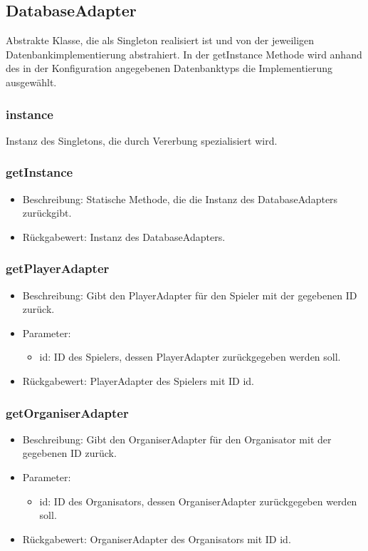 \documentclass[a4paper]{scrreprt}
\begin{document}
    \subsection{DatabaseAdapter}
    Abstrakte Klasse, die als Singleton realisiert ist und von der jeweiligen Datenbankimplementierung abstrahiert.
    In der getInstance Methode wird anhand des in der Konfiguration angegebenen Datenbanktyps die Implementierung ausgewählt.

    \subsubsection{instance}
    Instanz des Singletons, die durch Vererbung spezialisiert wird.

    \subsubsection{getInstance}
    \begin{itemize}
        \item Beschreibung: Statische Methode, die die Instanz des DatabaseAdapters zurückgibt.
        \item Rückgabewert: Instanz des DatabaseAdapters.
    \end{itemize}

    \subsubsection{getPlayerAdapter}
    \begin{itemize}
        \item Beschreibung: Gibt den PlayerAdapter für den Spieler mit der gegebenen ID zurück.
        \item Parameter:
        \begin{itemize}
            \item id: ID des Spielers, dessen PlayerAdapter zurückgegeben werden soll.
        \end{itemize}
        \item Rückgabewert: PlayerAdapter des Spielers mit ID id.
    \end{itemize}

    \subsubsection{getOrganiserAdapter}
    \begin{itemize}
        \item Beschreibung: Gibt den OrganiserAdapter für den Organisator mit der gegebenen ID zurück.
        \item Parameter:
        \begin{itemize}
            \item id: ID des Organisators, dessen OrganiserAdapter zurückgegeben werden soll.
        \end{itemize}
        \item Rückgabewert: OrganiserAdapter des Organisators mit ID id.
    \end{itemize}
\end{document}
